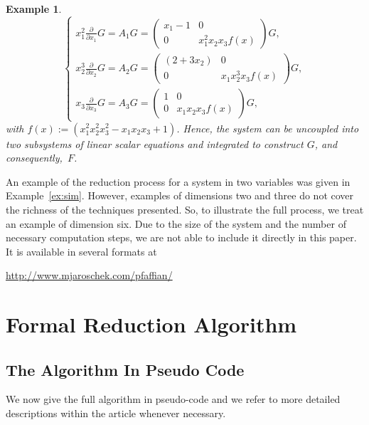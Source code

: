 \documentclass[final,1p,times,number,amsthm]{elsart}
\newtheorem{example}[lemma]{Example}
\newcommand{\pder}[2]{\frac{\partial}{\partial #2}#1}
\begin{document}
\begin{example}
\begin{equation*}
    \begin{cases}
      x_1^{2} \pder{G}{x_1} = A_1 G = \left(\begin{matrix}
          x_1 -1 & 0 \\
          0 & x_1^2 x_2 x_3 f(x)
        \end{matrix}\right) G, \\
      x_2^3 \pder{G}{x_2} = A_2 G= \left(\begin{matrix}
          (2+3 x_2)  &  0\\
          0 & x_1 x_2^3 x_3 f(x)
        \end{matrix}\right) G,\\
           x_3 \pder{G}{x_3} = A_3 G= \left(\begin{matrix}
          1 & 0 \\
        0 & x_1 x_2 x_3 f(x)
        \end{matrix}\right) G,
    \end{cases}
  \end{equation*}
with $f(x):=(x_1^2 x_2^2 x_3^2 - x_1 x_2 x_3 +1)$.
Hence, the system can be uncoupled into two subsystems of linear scalar
equations and integrated to construct $G$, and consequently,~$F$.
\end{example}

An example of the reduction process for a system in two variables was given in
Example~\ref{ex:sim}. However, examples of dimensions two and three do not cover
the richness of the techniques presented. So, to illustrate the full process, we
treat an example of dimension six. Due to the size of the system and the number
of necessary computation steps, we are not able to include it directly in this
paper. It is available in several formats at \vspace{0.1cm}
\begin{center}
\url{http://www.mjaroschek.com/pfaffian/}
\end{center}
\section{Formal Reduction Algorithm}
\label{mainpfaff}
\subsection{The Algorithm In Pseudo Code}
We now give the full algorithm in pseudo-code and we refer to more
detailed descriptions within the article whenever necessary.
\end{document}
